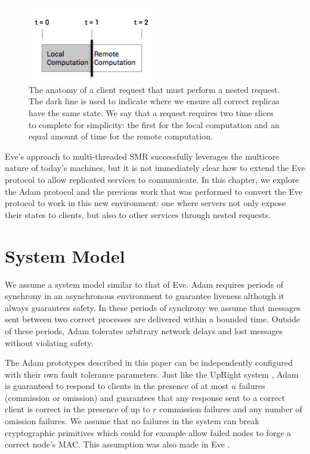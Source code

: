\documentclass[11pt, oneside]{report}
\begin{document}
\begin{figure}[h]
\centering
\includegraphics[width=0.5\textwidth]{RequestAnatomy.png}
\caption{\label{anatomy}The anatomy of a client request that must perform a nested request. The dark line is used to indicate where we ensure all correct replicas have the same state. We say that a request requires two time slices to complete for simplicity: the first for the local computation and an equal amount of time for the remote computation.}
\end{figure}

Eve's approach to multi-threaded SMR successfully leverages the multicore nature of today's machines, but it is not immediately clear how to extend the Eve protocol to allow replicated services to communicate. 
In this chapter, we explore the Adam protocol and the previous work that was performed to convert the Eve protocol to work in this new environment: one where servers not only expose their states to clients, but also to other services through nested requests.

\section{System Model}
We assume a system model similar to that of Eve. 
Adam requires periods of synchrony in an asynchronous environment to guarantee liveness although it always guarantees safety. 
In these periods of synchrony we assume that messages sent between two correct processes are delivered within a bounded time. 
Outside of these periods, Adam tolerates arbitrary network delays and lost messages without violating safety.

The Adam prototypes described in this paper can be independently configured with their own fault tolerance parameters. 
Just like the UpRight system \cite{upRight}, Adam is guaranteed to respond to clients in the presence of at most $u$ failures (commission or omission) and guarantees that any response sent to a correct client is correct in the presence of up to $r$ commission failures and any number of omission failures. 
We assume that no failures in the system can break cryptographic primitives which could for example allow failed nodes to forge a correct node's MAC. This assumption was also made in Eve \cite{manosThesis, eve}.
\end{document}
